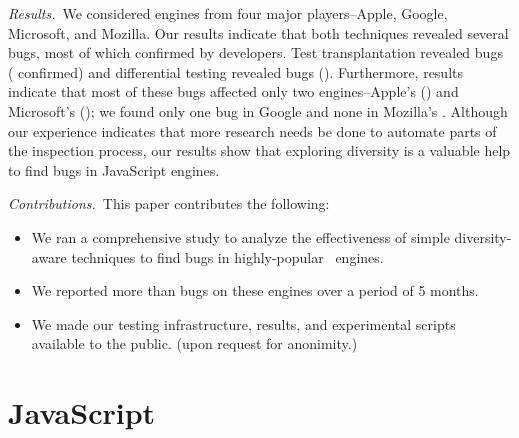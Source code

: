 \documentclass[10pt,conference,anonymous]{IEEEtran}
\begin{document}


\emph{Results.}~We considered engines from four major players--Apple,
Google, Microsoft, and Mozilla. Our results indicate that both
techniques revealed several bugs, most of which confirmed by
developers. Test transplantation revealed \noBugsTransplantation{}
bugs (\noBugsTransplantationConfirmed{} confirmed) and differential
testing revealed \noBugsDifferentialTesting{} bugs
(\noBugsDifferentialTestingConfirmed{}). Furthermore, results indicate
that most of these bugs affected only two engines--Apple's \jsc{}
(\percJSC{}) and Microsoft's \chakra{} (\percChakra{}); we found only
one bug in Google \veight{} and none in Mozilla's \smonkey{}. Although
our experience indicates that more research needs be done to automate
parts of the inspection process, our results show that exploring
diversity is a valuable help to find bugs in JavaScript engines.


\emph{Contributions.}~This paper contributes the following:
\begin{itemize}
  \item We ran a comprehensive study to analyze the effectiveness of
    simple diversity-aware techniques to find bugs in highly-popular
    \js\ engines. 
    
  \item We reported more than  bugs on these engines over a
    period of 5 months.

    
  \item We made our testing infrastructure, results, and experimental
    scripts available to the public. (upon request for anonimity.)

\end{itemize}



\section{JavaScript}
\label{sec:es6-design}
\label{sec:imp-dep-behavior}
\end{document}
